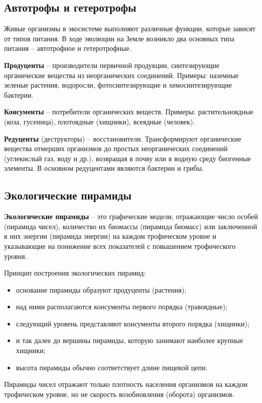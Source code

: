 \documentclass[a5paper, 11pt]{extarticle}
\theoremstyle{definition}
\theoremstyle{definition}
\theoremstyle{definition}
\numberwithin{figure}{section}
\begin{document}
\subsection{Автотрофы и гетеротрофы}

Живые организмы в экосистеме выполняют различные функции, которые зависят от типов питания. В ходе эволюции на Земле возникло два основных типа питания -- автотрофное и гетеротрофные.

\textbf{Продуценты} -- производители первичной продукции, синтезирующие органические вещества из неорганических соединений. Примеры: наземные зеленые растения, водоросли, фотосинтезирующие и хемосинтезирующие бактерии.

\textbf{Консументы} -- потребители органических веществ. Примеры: растительноядные (коза, гусеница), плотоядные (хищники), всеядные (человек).

\textbf{Редуценты} (деструкторы) -- восстановители. Трансформируют органические вещества отмерших организмов до простых неорганических соединений (углекислый газ, воду и др.), возвращая в почву или в водную среду биогенные элементы. В основном редуцентами являются бактерии и грибы.

\subsection{Экологические пирамиды}

\textbf{Экологические пирамиды} -- это графические модели, отражающие число особей (пирамида чисел), количество их биомассы (пирамида биомасс) или заключенной в них энергии (пирамида энергии) на каждом трофическом уровне и указывающие на понижение всех показателей с повышением трофического уровня.

Принцип построения экологических пирамид:
\begin{itemize}
    \item основание пирамиды образуют продуценты (растения);
    \item над ними располагаются консументы первого порядка (травоядные);
    \item следующий уровень представляют консументы второго порядка (хищники);
    \item и так далее до вершины пирамиды, которую занимают наиболее крупные хищники;
    \item высота пирамиды обычно соответствует длине пищевой цепи.
\end{itemize}

Пирамиды чисел отражают только плотность населения организмов на каждом трофическом уровне, но не скорость возобновления (оборота) организмов.
\end{document}
